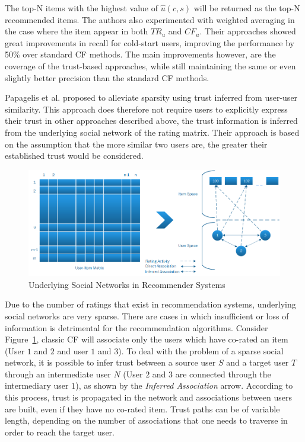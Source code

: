 The top-N items with the highest value of $\hat{u}(c,s)$ will be returned as
the top-N recommended items. The authors also experimented with weighted
averaging in the case where the item appear in both $TR_{u}$ and $CF_{u}$.
Their approaches showed great improvements in recall for cold-start users,
improving the performance by 50\% over standard CF methods. The main
improvements however, are the coverage of the trust-based approaches, while
still maintaining the same or even slightly better precision than the standard
CF methods.

Papagelis et al. \cite{Papagelis2005} proposed to alleviate sparsity using
trust inferred from user-user similarity. This approach does therefore not
require users to explicitly express their trust in other
approaches described above, the trust information is inferred from the
underlying social network of the rating matrix. Their approach is based on the
assumption that the more similar two users are, the greater their established
trust would be considered.

\begin{figure}[H]
    \includegraphics[width=5in]{image/trustnetwork.png}
    \centering
    \caption[Underlying Social Networks in Recommender Systems]{Underlying Social Networks in Recommender Systems}
    \label{figure:cfsocialnetwork}
\end{figure}

Due to the number of ratings that exist in recommendation systems, underlying
social networks are very sparse. There are cases in which insufficient or loss
of information is detrimental for the recommendation algorithms. Consider
Figure~\ref{figure:cfsocialnetwork}, classic CF will associate only the users
which have co-rated an item (User $1$ and $2$ and user $1$ and $3$). To deal
with the problem of a sparse social network, it is possible to infer trust
between a source user $S$ and a target user $T$ through an intermediate user
$N$ (User $2$ and $3$ are connected through the intermediary user $1$), as
shown by the \emph{Inferred Association} arrow. According to this process,
trust is propagated in the network and associations between users are built,
even if they have no co-rated item. Trust paths can be of variable length,
depending on the number of associations that one needs to traverse in order to
reach the target user.

